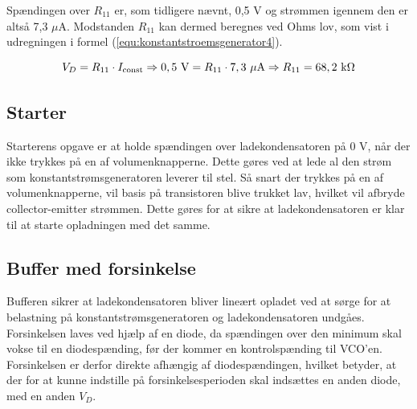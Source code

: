 Spændingen over $R_{11}$ er, som tidligere nævnt, 0,5 V og strømmen igennem den er altså 7,3 $\mu$A. Modstanden $R_{11}$ kan dermed beregnes ved Ohms lov, som vist i udregningen i formel (\ref{equ:konstantstroemsgenerator4}).

\begin{equation}
\label{equ:konstantstroemsgenerator4}
V_D = R_{11} \cdot I_{\mathrm{const}} \Rightarrow \mathrm{0,5~V} = R_{11} \cdot \mathrm{7,3~\mu A} \Rightarrow R_{11} = \mathrm{68,2~k\ohm}
\end{equation}

\subsection*{Starter}
\label{volumenkontrol-design-starter}

Starterens opgave er at holde spændingen over ladekondensatoren på 0 V, når der ikke trykkes på en af volumenknapperne. Dette gøres ved at lede al den strøm som konstantstrømsgeneratoren leverer til stel. Så snart der trykkes på en af volumenknapperne, vil basis på transistoren blive trukket lav, hvilket vil afbryde collector-emitter strømmen. Dette gøres for at sikre at ladekondensatoren er klar til at starte opladningen med det samme.
\subsection*{Buffer med forsinkelse}
\label{volumenkontrol-design-buffer}

Bufferen sikrer at ladekondensatoren bliver lineært opladet ved at sørge for at belastning på konstantstrømsgeneratoren og ladekondensatoren undgåes. Forsinkelsen laves ved hjælp af en diode, da spændingen over den minimum skal vokse til en diodespænding, før der kommer en kontrolspænding til VCO'en. Forsinkelsen er derfor direkte afhængig af diodespændingen, hvilket betyder, at der for at kunne indstille på forsinkelsesperioden skal indsættes en anden diode, med en anden $V_{D}$.